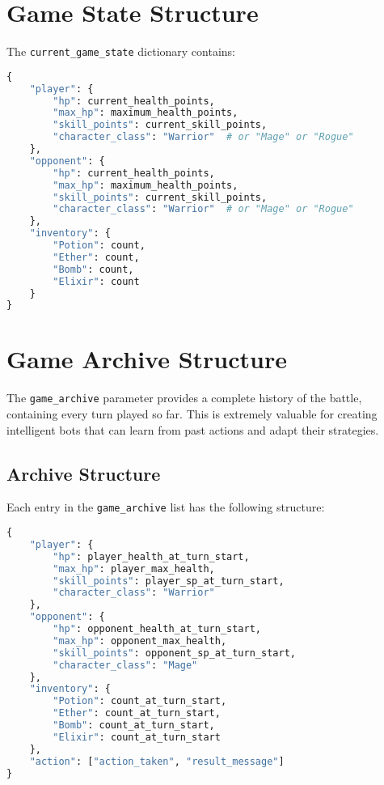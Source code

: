 \documentclass[12pt]{article}
\begin{document}
\section{Game State Structure}
\label{sec:game-state}

The \texttt{current\_game\_state} dictionary contains:

\begin{lstlisting}[language=Python, caption=Game State Structure]
{
    "player": {
        "hp": current_health_points,
        "max_hp": maximum_health_points,
        "skill_points": current_skill_points,
        "character_class": "Warrior"  # or "Mage" or "Rogue"
    },
    "opponent": {
        "hp": current_health_points,
        "max_hp": maximum_health_points,
        "skill_points": current_skill_points,
        "character_class": "Warrior"  # or "Mage" or "Rogue"
    },
    "inventory": {
        "Potion": count,
        "Ether": count,
        "Bomb": count,
        "Elixir": count
    }
}
\end{lstlisting}

\section{Game Archive Structure}
\label{sec:game-archive}

The \texttt{game\_archive} parameter provides a complete history of the battle, containing every turn played so far. This is extremely valuable for creating intelligent bots that can learn from past actions and adapt their strategies.

\subsection{Archive Structure}
Each entry in the \texttt{game\_archive} list has the following structure:

\begin{lstlisting}[language=Python, caption=Game Archive Entry Structure]
{
    "player": {
        "hp": player_health_at_turn_start,
        "max_hp": player_max_health,
        "skill_points": player_sp_at_turn_start,
        "character_class": "Warrior"
    },
    "opponent": {
        "hp": opponent_health_at_turn_start,
        "max_hp": opponent_max_health,
        "skill_points": opponent_sp_at_turn_start,
        "character_class": "Mage"
    },
    "inventory": {
        "Potion": count_at_turn_start,
        "Ether": count_at_turn_start,
        "Bomb": count_at_turn_start,
        "Elixir": count_at_turn_start
    },
    "action": ["action_taken", "result_message"]
}
\end{lstlisting}
\end{document}
